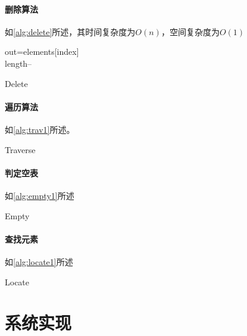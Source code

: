 \paragraph{删除算法}如\autoref{alg:delete}所述，其时间复杂度为$O(n)$，空间复杂度为$O(1)$
\par
\begin{algorithm}[H]
    \SetAlgoLined
    out=elements[index]
    \\
    length--
\caption{Delete}\label{alg:delete}
\end{algorithm}
\paragraph{遍历算法}如\autoref{alg:trav1}所述。
\par
\begin{algorithm}[H]
    \SetAlgoLined
    \caption{Traverse}\label{alg:trav1}
\end{algorithm}
\paragraph{判定空表}如\autoref{alg:empty1}所述
\par
\begin{algorithm}[H]
    \SetAlgoLined
    \Else{\Return\FALSE}
    \caption{Empty}\label{alg:empty1}
\end{algorithm}
\paragraph{查找元素}如\autoref{alg:locate1}所述
\par
\begin{algorithm}[H]
    \SetAlgoLined
    \caption{Locate} \label{alg:locate1}
\end{algorithm}
\section{系统实现}
